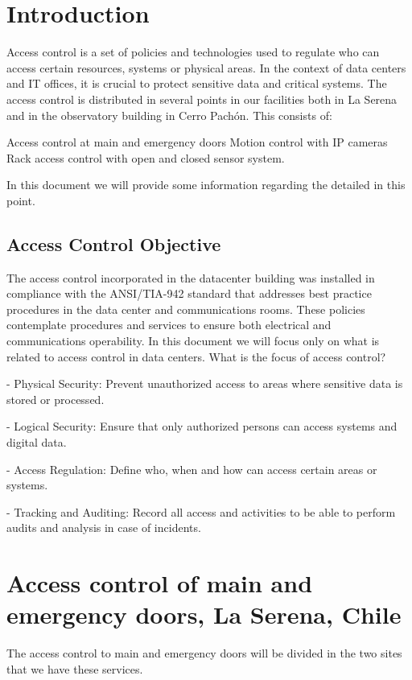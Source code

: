 \section{Introduction}

Access control is a set of policies and technologies used to regulate who can access certain resources, systems or physical areas. In the context of data centers and IT offices, it is crucial to protect sensitive data and critical systems.
The access control is distributed in several points in our facilities both in La Serena and in the observatory building in Cerro Pachón.
This consists of:

Access control at main and emergency doors
Motion control with IP cameras
Rack access control with open and closed sensor system.

In this document we will provide some information regarding the detailed in this point.

\subsection{Access Control Objective}

The access control incorporated in the datacenter building was installed in compliance with the ANSI/TIA-942 standard that addresses best practice procedures in the data center and communications rooms. These policies contemplate procedures and services to ensure both electrical and communications operability. In this document we will focus only on what is related to access control in data centers. What is the focus of access control?

- Physical Security: Prevent unauthorized access to areas where sensitive data is stored or processed.

- Logical Security: Ensure that only authorized persons can access systems and digital data.

- Access Regulation: Define who, when and how can access certain areas or systems.

- Tracking and Auditing: Record all access and activities to be able to perform audits and analysis in case of incidents.


\section{Access control of main and emergency doors, La Serena, Chile}

The access control to main and emergency doors will be divided in the two sites that we have these services.

